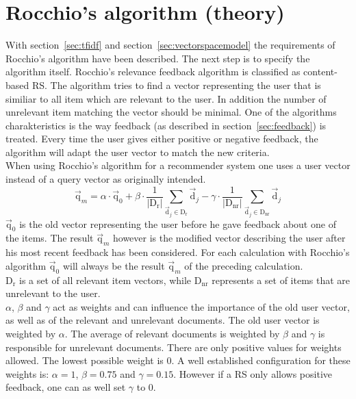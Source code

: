 
\section{Rocchio's algorithm (theory)}
\label{sec:rocchio}
\iffalse
Beschreibung des Rocchio algorithmus
\fi
With section~\ref{sec:tfidf} and section~\ref{sec:vectorspacemodel} the requirements of Rocchio's algorithm have been described.\citep[p.~178]{manning:2009}
The next step is to specify the algorithm itself.
Rocchio's relevance feedback algorithm is classified as content-based RS.\citep[p.~92]{lops:2011}
The algorithm tries to find a vector representing the user that is similiar to all item which are relevant to the user.
In addition the number of unrelevant item matching the vector should be minimal.\citep[p.~178-181]{manning:2009}
One of the algorithms charakteristics is the way feedback (as described in section~\ref{sec:feedback}) is treated.
Every time the user gives either positive or negative feedback, the algorithm will adapt the user vector to match the new criteria.\citep[p.~387-388]{pazzani:2007}
\\

When using Rocchio's algorithm for a recommender system one uses a user vector instead of a query vector as originally intended.
\begin{equation}
    \vec{\text{q}}_m =
        \alpha \cdot \vec{\text{q}}_0
        + \beta \cdot \frac{1}{|\text{D}_\text{r}|}\sum_{\vec{\text{d}}_j\in \text{D}_\text{r}} \vec{\text{d}}_j
        - \gamma \cdot \frac{1}{|\text{D}_\text{nr}|}\sum_{\vec{\text{d}}_j\in \text{D}_\text{nr}} \vec{\text{d}}_j
\end{equation}
$\vec{\text{q}}_0$ is the old vector representing the user before he gave feedback about one of the items.
The result $\vec{\text{q}}_m$ however is the modified vector describing the user after his most recent feedback has been considered.
For each calculation with Rocchio's algorithm $\vec{\text{q}}_0$ will always be the result $\vec{\text{q}}_m$ of the preceding calculation.\\
$\text{D}_\text{r}$ is a set of all relevant item vectors, while $\text{D}_\text{nr}$ represents a set of items that are unrelevant to the user.\\
$\alpha$, $\beta$ and $\gamma$ act as weights and can influence the importance of the old user vector, as well as of  the relevant and unrelevant documents.
The old user vector is weighted by $\alpha$.
The average of relevant documents is weighted by $\beta$ and $\gamma$ is responsible for unrelevant documents.
There are only positive values for weights allowed.
The lowest possible weight is 0.
A well established configuration for these weights is: $\alpha = 1$, $\beta = 0.75$ and $\gamma = 0.15$.
However if a RS only allows positive feedback, one can as well set $\gamma$ to 0.
\citep[p.~178-183]{manning:2009}

